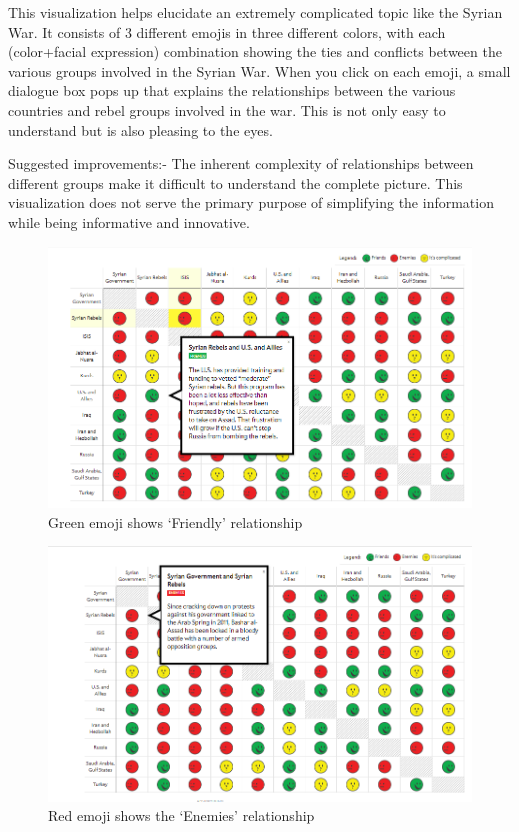 \documentclass[]{book}
\theoremstyle{definition}
\theoremstyle{definition}
\theoremstyle{definition}
\theoremstyle{remark}
\begin{document}
This visualization helps elucidate an extremely complicated topic like
the Syrian War. It consists of 3 different emojis in three different
colors, with each (color+facial expression) combination showing the ties
and conflicts between the various groups involved in the Syrian War.
When you click on each emoji, a small dialogue box pops up that explains
the relationships between the various countries and rebel groups
involved in the war. This is not only easy to understand but is also
pleasing to the eyes.

Suggested improvements:- The inherent complexity of relationships
between different groups make it difficult to understand the complete
picture. This visualization does not serve the primary purpose of
simplifying the information while being informative and innovative.

\begin{figure}
\centering
\includegraphics{images/img_syria_friendly.PNG}
\caption{Green emoji shows `Friendly' relationship}
\end{figure}

\begin{figure}
\centering
\includegraphics{images/img_syria_enemies.PNG}
\caption{Red emoji shows the `Enemies' relationship}
\end{figure}
\end{document}
